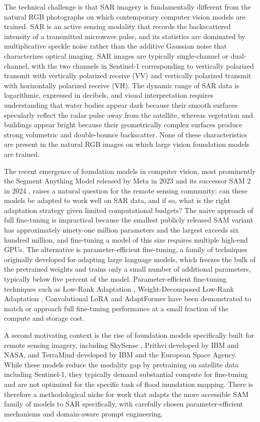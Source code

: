 \documentclass[11pt,a4paper,oneside]{report}
\begin{document}
The technical challenge is that SAR imagery is fundamentally different from the natural RGB photographs on which contemporary computer vision models are trained. SAR is an active sensing modality that records the backscattered intensity of a transmitted microwave pulse, and its statistics are dominated by multiplicative speckle noise rather than the additive Gaussian noise that characterizes optical imaging. SAR images are typically single-channel or dual-channel, with the two channels in Sentinel-1 corresponding to vertically polarized transmit with vertically polarized receive (VV) and vertically polarized transmit with horizontally polarized receive (VH). The dynamic range of SAR data is logarithmic, expressed in decibels, and visual interpretation requires understanding that water bodies appear dark because their smooth surfaces specularly reflect the radar pulse away from the satellite, whereas vegetation and buildings appear bright because their geometrically complex surfaces produce strong volumetric and double-bounce backscatter. None of these characteristics are present in the natural RGB images on which large vision foundation models are trained.

The recent emergence of foundation models in computer vision, most prominently the Segment Anything Model released by Meta in 2023 \cite{Kirillov2023SAM} and its successor SAM 2 in 2024 \cite{Ravi2025SAM2}, raises a natural question for the remote sensing community: can these models be adapted to work well on SAR data, and if so, what is the right adaptation strategy given limited computational budgets? The naive approach of full fine-tuning is impractical because the smallest publicly released SAM variant has approximately ninety-one million parameters and the largest exceeds six hundred million, and fine-tuning a model of this size requires multiple high-end GPUs. The alternative is parameter-efficient fine-tuning, a family of techniques originally developed for adapting large language models, which freezes the bulk of the pretrained weights and trains only a small number of additional parameters, typically below five percent of the model. Parameter-efficient fine-tuning techniques such as Low-Rank Adaptation \cite{Hu2022LoRA}, Weight-Decomposed Low-Rank Adaptation \cite{Liu2024DoRA}, Convolutional LoRA \cite{Zhong2024ConvLoRA} and AdaptFormer \cite{Chen2022AdaptFormer} have been demonstrated to match or approach full fine-tuning performance at a small fraction of the compute and storage cost.

A second motivating context is the rise of foundation models specifically built for remote sensing imagery, including SkySense \cite{Guo2024SkySense}, Prithvi developed by IBM and NASA, and TerraMind developed by IBM and the European Space Agency. While these models reduce the modality gap by pretraining on satellite data including Sentinel-1, they typically demand substantial compute for fine-tuning and are not optimized for the specific task of flood inundation mapping. There is therefore a methodological niche for work that adapts the more accessible SAM family of models to SAR specifically, with carefully chosen parameter-efficient mechanisms and domain-aware prompt engineering.
\end{document}
